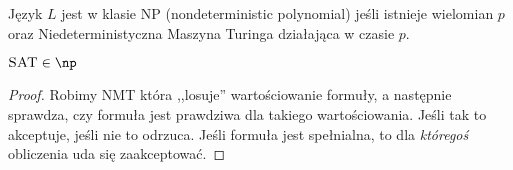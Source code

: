 \begin{definition}
	Język \( L \) jest w klasie NP (nondeterministic polynomial) jeśli istnieje wielomian \( p \) oraz Niedeterministyczna Maszyna Turinga działająca w czasie \( p \).
\end{definition}

\begin{theorem}
	\(\textsc{SAT} \in \np \)
\end{theorem}
\begin{proof}
	Robimy NMT która ,,losuje'' wartościowanie formuły, a następnie sprawdza, czy formuła jest prawdziwa dla takiego wartościowania. Jeśli tak to akceptuje, jeśli nie to odrzuca. Jeśli formuła jest spełnialna, to dla \textit{któregoś} obliczenia uda się zaakceptować.
\end{proof}